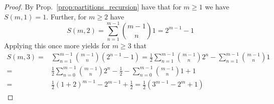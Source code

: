 \documentclass{scrartcl}
\theoremstyle{definition}
\begin{document}
\begin{proof}
    By Prop.~\ref{prop:partitions_recursion} have that for $m \geq 1$ we have $S(m, 1) = 1$.
    Further, for $m \geq 2$ have
    \begin{equation*}
        S(m, 2) = \sum_{n = 1}^{m - 1} {m - 1 \choose n} 1 = 2^{m - 1} - 1
    \end{equation*}
    Applying this once more yields for $m \geq 3$ that
    \begin{align*}
        S(m, 3) =& \sum_{n = 1}^{m - 1} {m - 1 \choose n} (2^{n - 1} - 1) = \frac 1 2 \sum_{n = 1}^{m - 1} {m - 1 \choose n} 2^n - \sum_{n = 1}^{m - 1} {m - 1 \choose n} 1 \\
        =&\frac 1 2 \sum_{n = 0}^{m - 1} {m - 1 \choose n} 2^n - \frac 1 2 - \sum_{n = 0}^{m - 1} {m - 1 \choose n} 1 + 1 \\
        =& \frac 1 2 (1 + 2)^{m - 1} - 2^{m - 1} + \frac 1 2 = \frac 1 2 (3^{m - 1} - 2^m + 1)
    \end{align*}
\end{proof}
\end{document}
